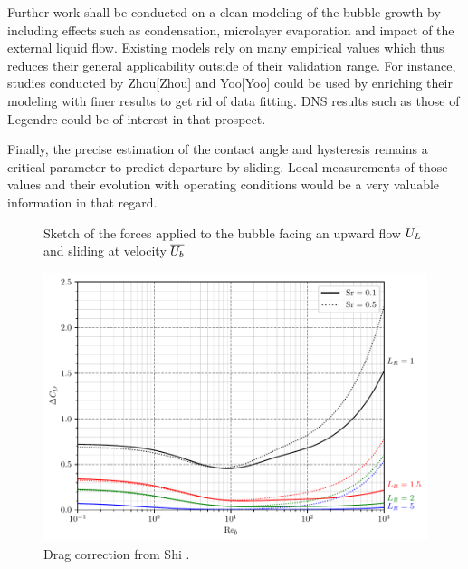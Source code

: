 \npar

Further work shall be conducted on a clean modeling of the bubble growth by including effects such as condensation, microlayer evaporation and impact of the external liquid flow. Existing models rely on many empirical values which thus reduces their general applicability outside of their validation range. For instance, studies conducted by Zhou[Zhou] and Yoo[Yoo] could be used by enriching their modeling with finer results to get rid of data fitting. DNS results such as those of Legendre \etal [Legendre] could be of interest in that prospect.

Finally, the precise estimation of the contact angle and hysteresis remains a critical parameter to predict departure by sliding. Local measurements of those values and their evolution with operating conditions would be a very valuable information in that regard. 





\begin{figure}[h!]
\centering

\caption{Sketch of the forces applied to the bubble facing an upward flow $\overline{U_{L}}$ and sliding at velocity $\overline{U_{b}}$}
\label{fig:bub_forces}
\end{figure}
 



\begin{figure}[h!]
\centering
\includegraphics[width=0.8\linewidth]{img/forces/corr_drag.pdf}
\caption{Drag correction from Shi \etal [Shi].}
\label{fig:CD_shi}
\end{figure}





